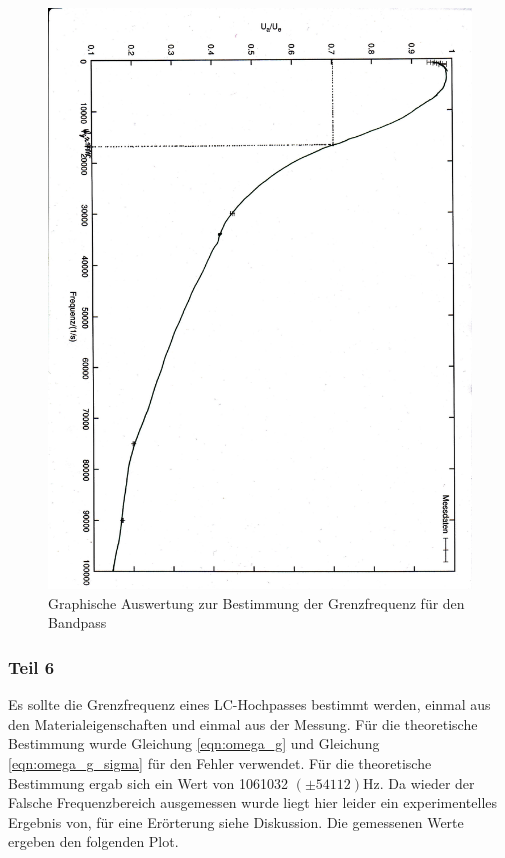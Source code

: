 \documentclass[12pt]{scrartcl}
\begin{document}
\begin{figure}[htbp] 
  \centering
    \includegraphics[scale = 0.5, angle=90]{teil_5.pdf}
  	\caption[Graphische Auswertung zur Bestimmung der Grenzfrequenz für den Bandpass]{Graphische Auswertung zur Bestimmung der Grenzfrequenz für den Bandpass}
  \label{fig:teil_5}
\end{figure}

\newpage

\subsubsection{Teil 6}
Es sollte die Grenzfrequenz eines LC-Hochpasses bestimmt werden, einmal aus den Materialeigenschaften und einmal aus der Messung. Für die theoretische Bestimmung wurde Gleichung \ref{eqn:omega_g} und Gleichung \ref{eqn:omega_g_sigma} für den Fehler verwendet. Für die theoretische Bestimmung ergab sich ein Wert von 1061032 $(\pm 54112)$Hz. Da wieder der Falsche Frequenzbereich ausgemessen wurde liegt hier leider ein experimentelles Ergebnis von, für eine Erörterung siehe Diskussion. Die gemessenen Werte ergeben den folgenden Plot.
\end{document}

